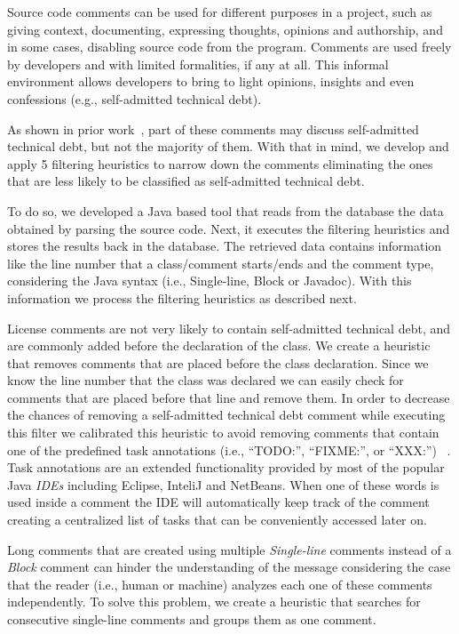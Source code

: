 Source code comments can be used for different purposes in a project, such as giving context, documenting, expressing thoughts, opinions and authorship, and in some cases, disabling source code from the program. Comments are used freely by developers and with limited formalities, if any at all. This informal environment allows developers to bring to light opinions, insights and even confessions (e.g., self-admitted technical debt). 

As shown in prior work~\cite{Maldonado2015MTD}, part of these comments may discuss self-admitted technical debt, but not the majority of them. With that in mind, we develop and apply 5 filtering heuristics to narrow down the comments eliminating the ones that are less likely to be classified as self-admitted technical debt.

To do so, we developed a Java based tool that reads from the database the data obtained by parsing the source code. Next, it executes the filtering heuristics and stores the results back in the database. The retrieved data contains information like the line number that a class/comment starts/ends and the comment type, considering the Java syntax (i.e., Single-line, Block or Javadoc). With this information we process the filtering heuristics as described next.

License comments are not very likely to contain self-admitted technical debt, and are commonly added before the declaration of the class. We create a heuristic that removes comments that are placed before the class declaration. Since we know the line number that the class was declared we can easily check for comments that are placed before that line and remove them. In order to decrease the chances of removing a self-admitted technical debt comment while executing this filter we calibrated this heuristic to avoid removing comments that contain one of the predefined task annotations (i.e., ``TODO:'', ``FIXME:'', or ``XXX:'') ~\cite{Storey2008ICSE}. Task annotations are an extended functionality provided by most of the popular Java \textit{IDEs} including Eclipse, InteliJ and NetBeans. When one of these words is used inside a comment the IDE will automatically keep track of the comment creating a centralized list of tasks that can be conveniently accessed later on.

Long comments that are created using multiple \emph{Single-line} comments instead of a \emph{Block} comment can hinder the understanding of the message considering the case that the reader (i.e., human or machine) analyzes each one of these comments independently. To solve this problem, we create a heuristic that searches for consecutive single-line comments and groups them as one comment.
 
